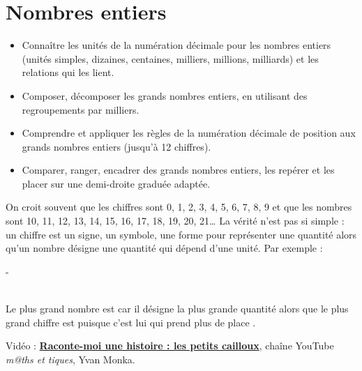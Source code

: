 \themaN
\graphicspath{{../Ch2_Nombres_entiers_et_decimaux/Images/}}

\chapter{Nombres entiers}
\label{C01}

\begin{prerequis}
   \begin{itemize}
      \item Connaître les unités de la numération décimale pour les nombres entiers (unités simples, dizaines, centaines, milliers, millions, milliards) et les relations qui les lient.
      \item Composer, décomposer les grands nombres entiers, en utilisant des regroupements par milliers.
      \item Comprendre et appliquer les règles de la numération décimale de position aux grands nombres entiers (jusqu’à 12 chiffres).
      \item Comparer, ranger, encadrer des grands nombres entiers, les repérer et les placer sur une demi-droite graduée adaptée.
   \end{itemize}
\end{prerequis}

\vfill

\begin{debat}
   On croit souvent que les chiffres sont 0, 1, 2, 3, 4, 5, 6, 7, 8, 9 et que les nombres sont 10, 11, 12, 13, 14, 15, 16, 17, 18, 19, 20, 21\dots{} La vérité n'est pas si simple : un chiffre est un signe, un symbole, une forme pour représenter une quantité alors qu'un nombre désigne une quantité qui dépend d'une unité. Par exemple : \\ [5mm]
   \centerline{\textcolor{B1}{\fontsize{30}{30} \; - \; \fontsize{60}{60}}} \\ [5mm]
   Le plus grand nombre est  \fg{} car il désigne la plus grande quantité alors que le plus grand chiffre est  \fg{} puisque c'est lui qui prend \og plus de place \fg.
   \bigskip
   \begin{cadre}[B2][F4]
      \begin{center}
         Vidéo : \href{https://www.youtube.com/watch?v=WRrLnktqUmE&feature=emb_logo}{\bf Raconte-moi une histoire : les petits cailloux}, chaîne YouTube {\it m@ths et tiques}, Yvan Monka.
      \end{center}
   \end{cadre}
\end{debat}

